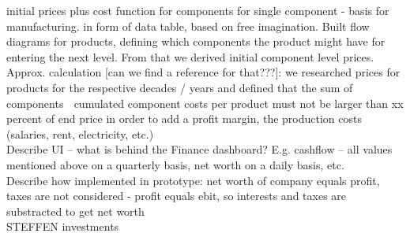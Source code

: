 initial prices plus cost function for components for single component - basis for manufacturing. in form of data table, based on free imagination. Built flow diagrams for products, defining which components the product might have for entering the next level. From that we derived initial component level prices. Approx. calculation [can we find a reference for that???]: we researched prices for products for the respective decades / years and defined that the sum of components  cumulated component costs per product must not be larger than xx percent of end price in order to add a profit margin, the production costs (salaries, rent, electricity, etc.) \\

Describe UI – what is behind the Finance dashboard? E.g. cashflow – all values mentioned above on a quarterly basis, net worth on a daily basis, etc.\\

Describe how implemented in prototype: net worth of company equals profit, taxes are not considered - profit equals ebit, so interests and taxes are substracted to get net worth\\

STEFFEN investments\\
